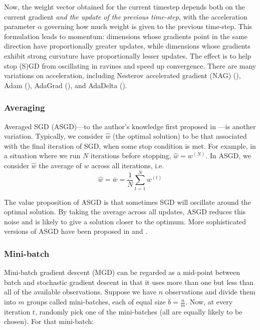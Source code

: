 \documentclass{article}
\begin{document}
Now, the weight vector obtained for the current timestep depends both on the
current gradient \textit{and the update of the previous time-step}, with the
acceleration parameter $\alpha$ governing how much weight is given to the
previous time-step. 
This formulation leads to momentum: dimensions whose
gradients point in the same direction have proportionally greater updates, while
dimensions whose gradients exhibit strong curvature have proportionally
lesser updates. The effect is to help stop (S)GD from oscillating in ravines and
speed up convergence. There are many variations on acceleration, including
Nesterov accelerated gradient (NAG) (\cite{nesterov}), Adam
(\cite{kingma2014adam}), AdaGrad
(\cite{duchi2011adaptive}), and AdaDelta (\cite{zeiler2012adadelta}).

\subsubsection{Averaging}

Averaged SGD (ASGD)---to the author's knowledge first proposed in 
\cite{polyak1992acceleration}---is another variation. Typically, we consider
$\hat{w}$ (the optimal solution) to be that associated with the final iteration
of SGD, when some stop condition is met. For example, in a situation where we
run $N$ iterations before stopping, $\hat{w} = w^{(N)}$. In ASGD, we consider $\hat{w}$ 
the average of $w$ across all iterations, i.e.
\begin{equation}
	\hat{w} = \bar{w} = \frac{1}{N} \sum_{t=1}^N w^{(t)}
\end{equation}

The value proposition of ASGD is that sometimes SGD will oscillate around the
optimal solution. By taking the average across all updates, ASGD reduces this
noise and is likely to give a solution closer to the optimum. More sophisticated
versions of ASGD have been proposed in 
\cite{zhang2004solving}
and 
\cite{xu2011towards}. 

\subsubsection{Mini-batch}

Mini-batch gradient descent (MGD) can be regarded as a mid-point between batch
and stochastic gradient descent in that it uses more than one but less than all of
the available observations. Suppose we have $n$ observations and divide them
into $m$ groups called mini-batches, each of equal size $b=\frac{n}{m}$. Now, at
every iteration $t$, randomly pick one of the mini-batches (all are equally
likely to be chosen). For that mini-batch:
\end{document}
